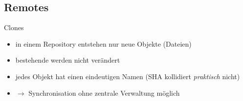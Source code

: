 \documentclass[compress,t,usenames,dvipsnames]{beamer}
\begin{document}
\subsection{Remotes}
\begin{frame}{Clones}
    \begin{itemize}
        \item in einem Repository entstehen nur neue Objekte (Dateien)
        \item bestehende werden nicht verändert
        \item jedes Objekt hat einen eindeutigen Namen (SHA kollidiert
            \textit{praktisch} nicht)
        \item $\rightarrow$ Synchronisation ohne zentrale Verwaltung möglich
    \end{itemize}
\end{frame}
\end{document}
